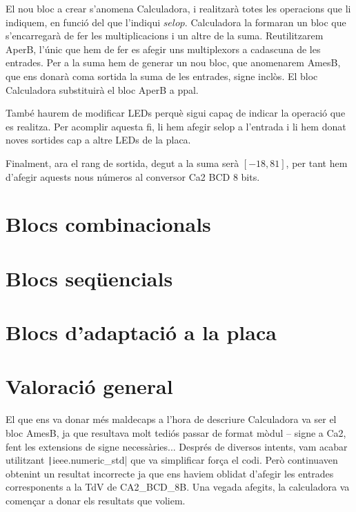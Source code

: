 El nou bloc a crear s'anomena \textsf{Calculadora}, i realitzarà totes les operacions que li indiquem, en funció del que l'indiqui $selop$. \textsf{Calculadora} la formaran un bloc que s'encarregarà de fer les multiplicacions i un altre de la suma. Reutilitzarem \textsf{AperB}, l'únic que hem de fer es afegir uns multiplexors a cadascuna de les entrades. Per a la suma hem de generar un nou bloc, que anomenarem \textsf{AmesB}, que ens donarà coma sortida la suma de les entrades, signe inclòs. El bloc \textsf{Calculadora} substituirà el bloc \textsf{AperB} a \textsf{ppal}.

També haurem de modificar LEDs perquè sigui capaç de indicar la operació que es realitza. Per acomplir aquesta fi, li hem afegir selop a l'entrada i li hem donat noves sortides cap a altre LEDs de la placa.

Finalment, ara el rang de sortida, degut a la suma serà $\left[-18,81\right]$, per tant hem d'afegir aquests nous números al conversor Ca2 BCD 8 bits.

\section{Blocs combinacionals}

\section{Blocs seqüencials}

\section{Blocs d'adaptació a la placa}

\section{Valoració general}

El que ens va donar més maldecaps a l'hora de descriure \textsf{Calculadora} va ser el bloc \textsf{AmesB}, ja que resultava molt tediós passar de format mòdul -- signe a Ca2, fent les extensions de signe necessàries... Després de diversos intents, vam acabar utilitzant \texttt|ieee.numeric_std| que va simplificar força el codi. Però continuaven obtenint un resultat incorrecte ja que ens haviem oblidat d'afegir les entrades corresponents a la TdV de \textsf{CA2\_BCD\_8B}. Una vegada afegits, la calculadora va començar a donar els resultats que voliem.
